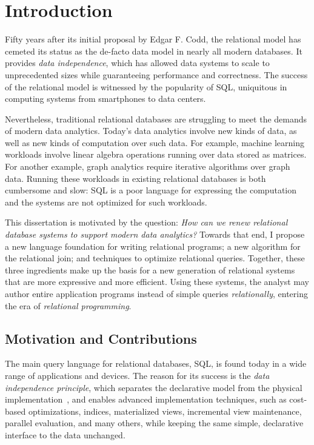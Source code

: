 \chapter{Introduction}
\label{sec:intro}

Fifty years after its initial proposal by Edgar F. Codd,
 the relational model has cemeted its status as the de-facto data model 
 in nearly all modern databases.
It provides {\em data independence}, 
 which has allowed data systems to scale to unprecedented sizes
 while guaranteeing performance and correctness.
The success of the relational model is witnessed 
 by the popularity of SQL, 
 uniquitous in computing systems 
 from smartphones to data centers.

 Nevertheless, traditional relational databases are struggling 
  to meet the demands of modern data analytics.
Today's data analytics involve new kinds of data, 
 as well as new kinds of computation over such data. 
For example, machine learning workloads involve linear algebra operations
 running over data stored as matrices. 
For another example, graph analytics require iterative algorithms
 over graph data.
Running these workloads in existing relational databases 
 is both cumbersome and slow:
 SQL is a poor language for expressing the computation
 and the systems are not optimized for such workloads.

This dissertation is motivated by the question: 
{\em How can we renew relational database systems 
 to support modern data analytics?}
Towards that end, I propose a new language foundation
 for writing relational programs;
 a new algorithm for the relational join;
 and techniques to optimize relational queries. 
Together, these three ingredients make up 
 the basis for a new generation of relational systems
 that are more expressive and more efficient.
Using these systems,
 the analyst may author entire application programs
 instead of simple queries {\em relationally},
 entering the era of {\em relational programming}.

\section{Motivation and Contributions}
\label{sec:intro:motivation}

The main query language for relational databases, SQL, 
 is found today in a wide range of applications and
 devices. 
The reason for its success is the {\em data
  independence principle}, which separates the declarative model from
the physical implementation~\cite{DBLP:journals/cacm/Codd70}, and
enables advanced implementation techniques, such as cost-based
optimizations, indices, materialized views, incremental view
maintenance, parallel evaluation, and many others, while keeping the
same simple, declarative interface to the data unchanged.

